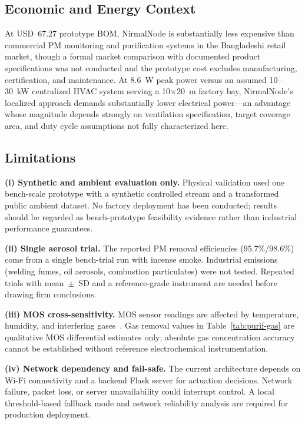 \subsection{Economic and Energy Context}
At USD~67.27 prototype BOM, NirmalNode is substantially less expensive than commercial
PM monitoring and purification systems in the Bangladeshi retail market, though a formal
market comparison with documented product specifications was not conducted and the
prototype cost excludes manufacturing, certification, and maintenance. At 8.6~W peak
power versus an assumed 10--30~kW centralized HVAC system serving a 10$\times$20~m
factory bay, NirmalNode's localized approach demands substantially lower electrical
power---an advantage whose magnitude depends strongly on ventilation specification,
target coverage area, and duty cycle assumptions not fully characterized here.

\subsection{Limitations}
\label{sec:limits}

\textbf{(i) Synthetic and ambient evaluation only.} Physical validation used one
bench-scale prototype with a synthetic controlled stream and a transformed public ambient
dataset. No factory deployment has been conducted; results should be regarded as
bench-prototype feasibility evidence rather than industrial performance guarantees.

\textbf{(ii) Single aerosol trial.} The reported PM removal efficiencies (95.7\%/98.6\%)
come from a single bench-trial run with incense smoke. Industrial emissions (welding
fumes, oil aerosols, combustion particulates) were not tested. Repeated trials with
mean~$\pm$~SD and a reference-grade instrument are needed before drawing firm conclusions.

\textbf{(iii) MOS cross-sensitivity.} MOS sensor readings are affected by temperature,
humidity, and interfering gases~\citep{mos2024trac,sensorcorrection2025npj}. Gas removal
values in Table~\ref{tab:purif-gas} are qualitative MOS differential estimates only;
absolute gas concentration accuracy cannot be established without reference electrochemical
instrumentation.

\textbf{(iv) Network dependency and fail-safe.} The current architecture depends on
Wi-Fi connectivity and a backend Flask server for actuation decisions. Network failure,
packet loss, or server unavailability could interrupt control. A local threshold-based
fallback mode and network reliability analysis are required for production deployment.

